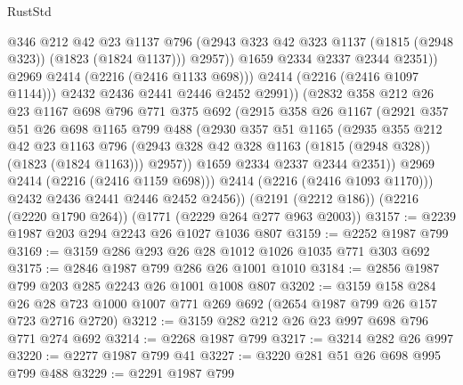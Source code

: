 \begin{lexlean}{RustStd}
\begin{coremodule}
                          @346
                          @212
                          @42
                          @23
                          @1137
                          @796
                          (@2943 @323 @42 @323 @1137 (@1815 (@2948 @323)) (@1823 (@1824 @1137)))
                          @2957))
                      @1659
                      @2334
                      @2337
                      @2344
                      @2351))
                  @2969
                  @2414
                  (@2216 (@2416 @1133 @698)))
                @2414
                (@2216 (@2416 @1097 @1144)))
              @2432
              @2436
              @2441
              @2446
              @2452
              @2991))
          (@2832
            @358
            @212
            @26
            @23
            @1167
            @698
            @796
            @771
            @375
            @692
            (@2915
              @358
              @26
              @1167
              (@2921
                @357
                @51
                @26
                @698
                @1165
                @799
                @488
                (@2930
                  @357
                  @51
                  @1165
                  (@2935
                    @355
                    @212
                    @42
                    @23
                    @1163
                    @796
                    (@2943 @328 @42 @328 @1163 (@1815 (@2948 @328)) (@1823 (@1824 @1163)))
                    @2957))
                @1659
                @2334
                @2337
                @2344
                @2351))
            @2969
            @2414
            (@2216 (@2416 @1159 @698)))
          @2414
          (@2216 (@2416 @1093 @1170)))
        @2432
        @2436
        @2441
        @2446
        @2452
        @2456))
    (@2191 (@2212 @186))
    (@2216 (@2220 @1790 @264))
    (@1771 (@2229 @264 @277 @963 @2003))
@3157 := @2239 @1987 @203 @294 @2243 @26 @1027 @1036 @807
@3159 := @2252 @1987 @799
@3169 := @3159 @286 @293 @26 @28 @1012 @1026 @1035 @771 @303 @692
@3175 := @2846 @1987 @799 @286 @26 @1001 @1010
@3184 := @2856 @1987 @799 @203 @285 @2243 @26 @1001 @1008 @807
@3202 := @3159
    @158
    @284
    @26
    @28
    @723
    @1000
    @1007
    @771
    @269
    @692
    (@2654 @1987 @799 @26 @157 @723 @2716 @2720)
@3212 := @3159 @282 @212 @26 @23 @997 @698 @796 @771 @274 @692
@3214 := @2268 @1987 @799
@3217 := @3214 @282 @26 @997
@3220 := @2277 @1987 @799 @41
@3227 := @3220 @281 @51 @26 @698 @995 @799 @488
@3229 := @2291 @1987 @799

\end{coremodule}
\end{lexlean}
